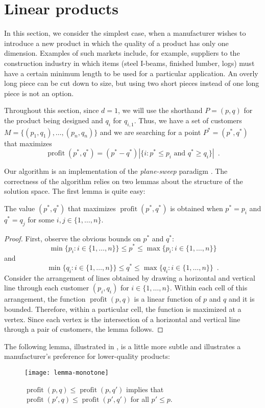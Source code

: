 \documentclass[lotsofwhite]{patmorin}
\newcommand{\val}{\operatorname{profit}}
\begin{document}
\section{Linear products}

In this section, we consider the simplest case, when a manufacturer
wishes to introduce a new product in which the quality of a product
has only one dimension.  Examples of such markets include, for example,
suppliers to the construction industry in which items (steel I-beams,
finished lumber, logs) must have a certain minimum length to be used for
a particular application.  An overly long piece can be cut down to size,
but using two short pieces instead of one long piece is not an option.

Throughout this section, since $d=1$, we will use the shorthand $P=(p,q)$
for the product being designed and $q_i$ for $q_{i,1}$.  Thus, we have a
set of customers $M=\{(p_1,q_1),\ldots,(p_{n},q_n)\}$ and we are searching
for a point $P^*=(p^*,q^*)$ that maximizes 
\[
   \val(p^*,q^*) = (p^*-q^*)
     |\{i : \mbox{$p^*\le p_i$ and $q^*\ge q_i$}\}|  \enspace .
\]

Our algorithm is an implementation of the \emph{plane-sweep} paradigm
\cite{bo79}. The correctness of the algorithm relies on two lemmas about
the structure of the solution space.  The first lemma is quite easy:
\begin{lem}
  The value $(p^*,q^*)$ that maximizes $\val(p^*,q^*)$ is obtained when
  $p^* = p_i$ and $q^*=q_j$ for some $i,j\in\{1,\ldots,n\}$.
\end{lem}

\begin{proof}
  First, observe the obvious bounds on $p^*$ and $q^*$:
  \[
     \min\{p_i:i\in\{1,\ldots,n\}\} \le p^* 
      \le \max\{p_i:i\in\{1,\ldots,n\}\} 
  \] 
  and 
  \[
     \min\{q_i:i\in\{1,\ldots,n\}\} \le q^* 
      \le \max\{q_i:i\in\{1,\ldots,n\}\} \enspace .
  \] 
  Consider the arrangement of lines obtained by drawing a
  horizontal and vertical line through each customer $(p_i,q_i)$
  for $i\in\{1,\ldots,n\}$.  Within each cell of this arrangement,
  the function $\val(p,q)$ is a linear function of $p$ and $q$ and it is
  bounded.  Therefore, within a particular cell, the function is maximized
  at a vertex.  Since each vertex is the intersection of a horizontal
  and vertical line through a pair of customers, the lemma follows.
\end{proof}

The following lemma, illustrated in , is a
little more subtle and illustrates a manufacturer's preference for
lower-quality products:
\begin{figure}
  \begin{center}
    \texttt{[image: lemma-monotone]}
  \end{center}
  \caption{$\val(p,q) \le \val(p,q')$ implies that $\val(p',q) \le
           \val(p',q')$ for all $p' \le p$.}
\end{figure}
\end{document}
